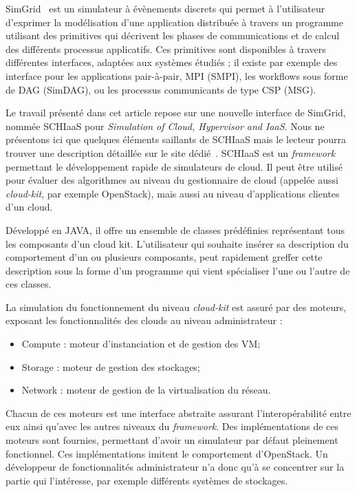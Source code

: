 \documentclass[parallelisme]{compas2017}
\begin{document}
SimGrid~\cite{simgrid}  est un  simulateur à  évènements discrets  qui permet  à
l'utilisateur d'exprimer la modélisation  d'une application distribuée à travers
un  programme utilisant  des  primitives  qui  décrivent  les phases  de
communications et de calcul des différents processus applicatifs. Ces primitives
sont disponibles à travers différentes interfaces, adaptées aux systèmes étudiés
; il  existe par exemple  des interface  pour les applications  pair-à-pair, MPI
(SMPI), les workflows sous forme de DAG (SimDAG), ou les processus communicants
de type CSP (MSG).

Le  travail présenté  dans  cet article  repose sur  une  nouvelle interface  de
SimGrid,  nommée SCHIaaS pour \textit{Simulation of Cloud, Hypervisor and 
IaaS}.  Nous  ne
présentons ici que quelques éléments saillants de SCHIaaS mais le lecteur pourra
trouver  une  description  détaillée  sur  le  site  dédié~\cite{schiaas-gforge}.
SCHIaaS  est  un  \textit{framework}   permettant  le  développement  rapide  de
simulateurs de cloud. Il peut être utilisé pour évaluer des algorithmes au 
niveau du gestionnaire de cloud (appelée aussi \textit{cloud-kit},  par exemple
OpenStack), mais aussi au niveau d'applications clientes d'un cloud.

Développé en JAVA, il offre un ensemble de classes prédéfinies représentant tous
les composants d'un cloud kit. L'utilisateur qui souhaite insérer sa description
du  comportement d'un  ou plusieurs  composants, peut  rapidement greffer  cette
description sous la forme d'un programme  qui vient spécialiser l'une ou l'autre
de ces classes.



La simulation du fonctionnement du  niveau \textit{cloud-kit} est assuré par des
moteurs, exposant les fonctionnalités des clouds au niveau administrateur :
\begin{itemize}
 \item Compute : moteur d'instanciation et de gestion des VM;
 \item Storage : moteur de gestion des stockages;
 \item Network : moteur de gestion de la virtualisation du réseau.
\end{itemize}

Chacun de  ces moteurs est  une interface abstraite  assurant l'interopérabilité
entre  eux  ainsi  qu'avec  les   autres  niveaux  du  \textit{framework}.   Des
implémentations de ces  moteurs sont fournies, permettant  d'avoir un simulateur
par défaut pleinement fonctionnel.   Ces implémentations imitent le comportement
d'OpenStack. Un développeur  de fonctionnalités administrateur n'a  donc qu'à se
concentrer sur  la partie  qui l'intéresse, par  exemple différents  systèmes de
stockages.
\end{document}
